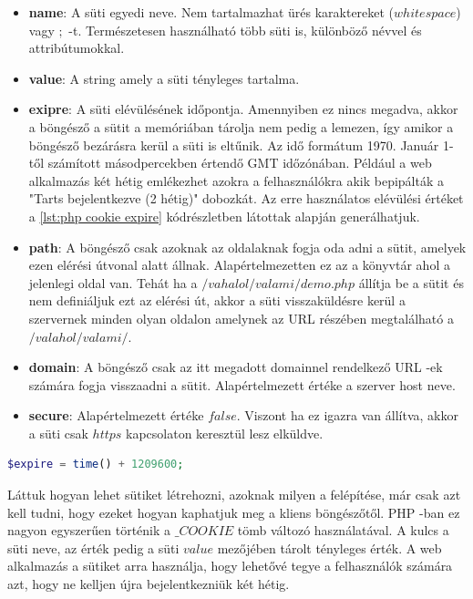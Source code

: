 \documentclass[12pt]{report}
\theoremstyle{definition}
\begin{document}
	\begin{itemize}
		\item\textbf{name}: A süti egyedi neve. Nem tartalmazhat ürés karaktereket ($whitespace$) vagy $;$ -t. Természetesen használható több süti is, különböző névvel és attribútumokkal.
		\item\textbf{value}: A string amely a süti tényleges tartalma.
		\item\textbf{exipre}: A süti elévülésének időpontja. Amennyiben ez nincs megadva, akkor a böngésző a sütit a memóriában tárolja nem pedig a lemezen, így amikor a böngésző bezárásra kerül a süti is eltűnik. Az idő formátum 1970. Január 1-től számított másodpercekben értendő GMT időzónában. Például a web alkalmazás két hétig emlékezhet azokra a felhasználókra akik bepipálták a "Tarts bejelentkezve (2 hétig)" dobozkát. Az erre használatos elévülési értéket a \ref{lst:php cookie expire} kódrészletben látottak alapján generálhatjuk.
		\item\textbf{path}: A böngésző csak azoknak az oldalaknak fogja oda adni a sütit, amelyek ezen elérési útvonal alatt állnak. Alapértelmezetten ez az a könyvtár ahol a jelenlegi oldal van. Tehát ha a $/vahalol/valami/demo.php$ állítja be a sütit és nem definiáljuk ezt az elérési út, akkor a süti visszaküldésre kerül a szervernek minden olyan oldalon amelynek az URL részében megtalálható a $/valahol/valami/$.
		\item\textbf{domain}: A böngésző csak az itt megadott domainnel rendelkező URL -ek számára fogja visszaadni a sütit. Alapértelmezett értéke a szerver host neve.
		\item\textbf{secure}: Alapértelmezett értéke $false$. Viszont ha ez igazra van állítva, akkor a süti csak $https$ kapcsolaton keresztül lesz elküldve.
	\end{itemize}
	
	\noindent\begin{minipage}{\linewidth}
		\begin{lstlisting}[language=php,label={lst:php cookie expire}, caption={PHP cookie expire generálása 2 hét múlvára}]
$expire = time() + 1209600;
		\end{lstlisting}
	\end{minipage}
	
	Láttuk hogyan lehet sütiket létrehozni, azoknak milyen a felépítése, már csak azt kell tudni, hogy ezeket hogyan kaphatjuk meg a kliens böngészőtől. PHP -ban ez nagyon egyszerűen történik a $\_COOKIE$ tömb változó használatával. A kulcs a süti neve, az érték pedig a süti $value$ mezőjében tárolt tényleges érték. A web alkalmazás a sütiket arra használja, hogy lehetővé tegye a felhasználók számára azt, hogy ne kelljen újra bejelentkezniük két hétig. 
	
\end{document}
